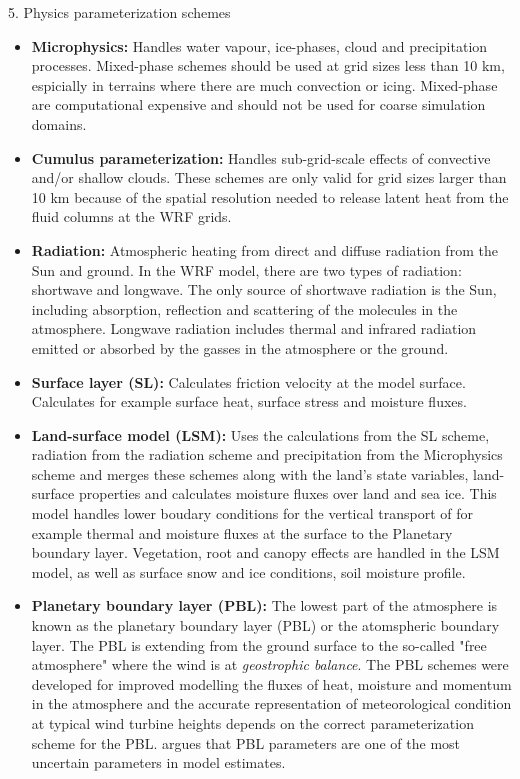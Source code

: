 \documentclass{beamer}
\begin{document}
\begin{frame}[fragile, allowframebreaks=1, t]{5. Physics parameterization schemes}
\begin{itemize}
	\item \textbf{Microphysics:} Handles water vapour, ice-phases, cloud and precipitation processes. Mixed-phase schemes should be used at grid sizes less than 10 km, espicially in terrains where there are much convection or icing. Mixed-phase are computational expensive and should not be used for coarse simulation domains.  
	\item \textbf{Cumulus parameterization:} Handles sub-grid-scale effects of convective and/or shallow clouds.  These schemes are only valid for grid sizes larger than 10 km because of the spatial resolution needed to release latent heat from the fluid columns at the WRF grids. 
	\item \textbf{Radiation:} Atmospheric heating from direct and diffuse radiation from the Sun and ground. In the WRF model, there are two types of radiation: shortwave and longwave. The only source of shortwave radiation is the Sun, including absorption, reflection and scattering of the molecules in the atmosphere. Longwave radiation includes thermal and infrared radiation emitted or absorbed by the gasses in the atmosphere or the ground.  
	\item \textbf{Surface layer (SL):} Calculates friction velocity at the model surface. Calculates for example surface heat, surface stress and moisture fluxes. 
	\item \textbf{Land-surface model (LSM):} Uses the calculations from the SL scheme, radiation from the radiation scheme and precipitation from the Microphysics scheme and merges these schemes along with the land's state variables, land-surface properties and calculates moisture fluxes over land and sea ice. This model handles lower boudary conditions for the vertical transport of for example thermal and moisture fluxes at the surface to the Planetary boundary layer. Vegetation, root and canopy effects are handled in the LSM model, as well as surface snow and ice conditions, soil moisture profile. 
	\item \textbf{Planetary boundary layer (PBL):} The lowest part of the atmosphere is known as the planetary boundary layer (PBL) or the atomspheric boundary layer. The PBL is extending from the ground surface to the so-called "free atmosphere" where the wind is at \textit{geostrophic balance}. The PBL schemes were developed for improved modelling the fluxes of heat, moisture and momentum in the atmosphere \citep{deppe2013wrf} and the accurate representation of meteorological condition at typical wind turbine heights depends on the correct parameterization scheme for the PBL. \citet{balzarini2014sensitivity} argues that PBL parameters are one of the most uncertain parameters in model estimates.
	

\end{itemize}
\end{frame}
\end{document}
